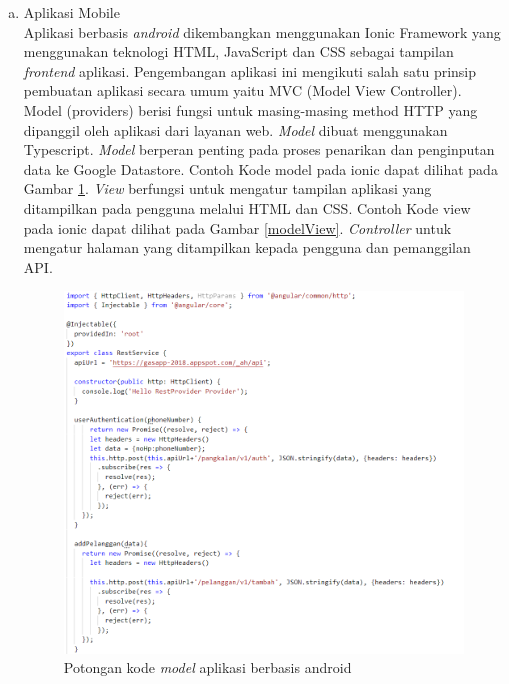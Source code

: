 \begin{enumerate}[a.]
		\item Aplikasi Mobile
		\\ Aplikasi berbasis \textit{android} dikembangkan menggunakan Ionic Framework yang menggunakan teknologi HTML, JavaScript dan CSS sebagai tampilan \textit{frontend} aplikasi. Pengembangan aplikasi ini mengikuti salah satu prinsip pembuatan aplikasi secara umum yaitu MVC (Model View Controller). Model (providers) berisi fungsi untuk masing-masing method HTTP yang dipanggil oleh aplikasi dari layanan web. \textit{Model} dibuat menggunakan Typescript. \textit{Model} berperan penting pada proses penarikan dan penginputan data ke Google Datastore. Contoh Kode model pada ionic dapat dilihat pada Gambar \ref{modelMobile}. \textit{View} berfungsi untuk mengatur tampilan aplikasi yang ditampilkan pada pengguna melalui HTML dan CSS. Contoh Kode view pada ionic dapat dilihat pada Gambar \ref{modelView}. \textit{Controller} untuk mengatur halaman yang ditampilkan kepada pengguna dan pemanggilan API. \\
		
		\vspace{-0.4cm}
		\begin{figure}[H]
			\center
			\includegraphics [width = 12cm]{gambar/kode/model-mobile}
			\caption{Potongan kode \textit{model} aplikasi berbasis android}
			\label{modelMobile}
		\end{figure}
		

\end{enumerate}
